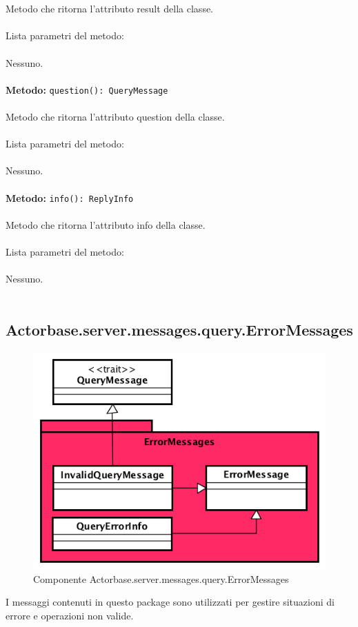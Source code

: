 \documentclass[a4paper]{article}
\begin{document}
			\\ \\
			Metodo che ritorna l'attributo result della classe.
			\\ \\
			Lista parametri del metodo:
			\\ \\
			Nessuno.
			\\ \\		
			\textbf{Metodo: } \texttt{question(): QueryMessage}
			\\ \\
			Metodo che ritorna l'attributo question della classe.
			\\ \\
			Lista parametri del metodo:
			\\ \\
			Nessuno.
			\\ \\
			\textbf{Metodo: } \texttt{info(): ReplyInfo}
			\\ \\	
			Metodo che ritorna l'attributo info della classe.
			\\ \\
			Lista parametri del metodo:
			\\ \\
			Nessuno.
			\\ \\
			
	\subsection{Actorbase.server.messages.query.ErrorMessages}
			\begin{figure}[H]
			\centering
			\includegraphics[width=\textwidth]{Server/errorMessagesLevel.png}
			\caption{Componente Actorbase.server.messages.query.ErrorMessages}
		\end{figure}
		I messaggi contenuti in questo package sono utilizzati per gestire situazioni di errore e operazioni non valide.
		
\end{document}
